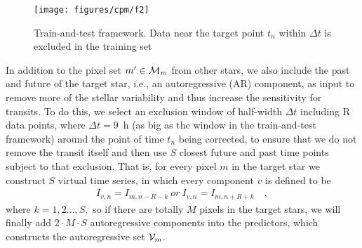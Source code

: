 \begin{figure}[p]
\begin{center}
\texttt{[image: figures/cpm/f2]}
\end{center}
\caption[Train-and-test framework digram]{
  \label{train-and-test} 
  Train-and-test framework. 
  Data near the target point $t_{n}$ within $\Delta t$ is excluded in the training set}
\end{figure}
  
In addition to the pixel set $m'\in\mathcal{M}_m$ from other stars,  
  we also include the past and future of the target star, i.e., an autoregressive (AR) component, as input 
  to remove more of the stellar variability and thus increase the sensitivity for transits. 
To do this, we select an exclusion window of half-width $\Delta t$ including R data points, 
  where $\Delta t=9$\, h (as big as the window in the train-and-test framework) 
  around the point of time $t_{n}$ being corrected, 
  to ensure that we do not remove the transit itself 
  and then use $S$ closest future and past time points subject to that exclusion. 
That is, for every pixel $m$ in the target star we construct $S$ virtual time series, 
  in which every component $v$ is defined to be     
\begin{eqnarray}
I_{v,n} = I_{m,n-R-k}\ or\ I_{v,n} = I_{m,n+R+k}
\quad,
\end{eqnarray}
where $k = 1, 2\dots, S,$ so if there are totally $M$ pixels in the target stars, 
  we will finally add $2\cdot M\cdot S$
  autoregressive components into the predictors, which constructs the autoregressive set $\mathcal{V}_m$.

